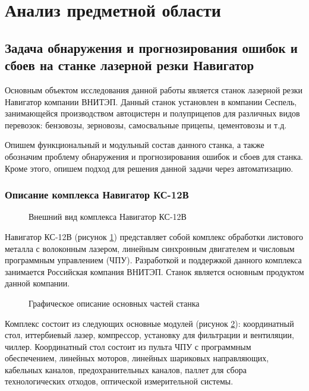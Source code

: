 \section{Анализ предметной области}

\subsection{Задача обнаружения и прогнозирования ошибок и сбоев на станке лазерной резки Навигатор}

Основным объектом исследования данной работы является станок лазерной резки Навигатор
компании ВНИТЭП. Данный станок установлен в компании Сеспель,
занимающейся производством автоцистерн и полуприцепов для различных видов перевозок:
бензовозы, зерновозы, самосвальные прицепы, цементовозы и т.д.

Опишем функциональный и модульный состав данного станка, а также обозначим
проблему обнаружения и прогнозирования ошибок и сбоев для станка.
Кроме этого, опишем подход для решения данной задачи через автоматизацию.

\subsubsection{Описание комплекса Навигатор КС-12В}

\begin{figure}[h]
    \caption{Внешний вид комплекса Навигатор КС-12В}
    \label{navigator}
\end{figure}

Навигатор КС-12В (рисунок \ref{navigator})  представляет собой комплекс обработки листового металла с волоконным лазером,
линейным синхронным двигателем и числовым программным управлением (ЧПУ).
Разработкой и поддержкой данного комплекса занимается Российская компания ВНИТЭП.
Станок является основным продуктом данной компании.

\begin{figure}[h]
    \caption{Графическое описание основных частей станка}
    \label{modules}
\end{figure}

Комплекс состоит из следующих основные модулей (рисунок \ref{modules}):
координатный стол, иттербиевый лазер, компрессор, установку для фильтрации и вентиляции, чиллер.
Координатный стол состоит из пульта ЧПУ с программным обеспечением,
линейных моторов, линейных шариковых направляющих,
кабельных каналов, предохранительных каналов,
паллет для сбора технологических отходов,
оптической измерительной системы.

